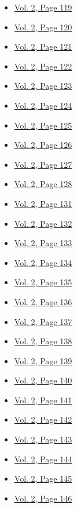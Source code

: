 \begin{itemize}
\begin{itemize}
  \item
    \protect\hyperlink{g-page-331}{Vol. 2, Page 119}
  \item
    \protect\hyperlink{g-page-332}{Vol. 2, Page 120}
  \item
    \protect\hyperlink{g-page-333}{Vol. 2, Page 121}
  \item
    \protect\hyperlink{g-page-334}{Vol. 2, Page 122}
  \item
    \protect\hyperlink{g-page-335}{Vol. 2, Page 123}
  \item
    \protect\hyperlink{g-page-336}{Vol. 2, Page 124}
  \item
    \protect\hyperlink{g-page-337}{Vol. 2, Page 125}
  \item
    \protect\hyperlink{g-page-338}{Vol. 2, Page 126}
  \item
    \protect\hyperlink{g-page-339}{Vol. 2, Page 127}
  \item
    \protect\hyperlink{g-page-340}{Vol. 2, Page 128}
  \item
    \protect\hyperlink{g-page-343}{Vol. 2, Page 131}
  \item
    \protect\hyperlink{g-page-344}{Vol. 2, Page 132}
  \item
    \protect\hyperlink{g-page-345}{Vol. 2, Page 133}
  \item
    \protect\hyperlink{g-page-346}{Vol. 2, Page 134}
  \item
    \protect\hyperlink{g-page-347}{Vol. 2, Page 135}
  \item
    \protect\hyperlink{g-page-348}{Vol. 2, Page 136}
  \item
    \protect\hyperlink{g-page-349}{Vol. 2, Page 137}
  \item
    \protect\hyperlink{g-page-350}{Vol. 2, Page 138}
  \item
    \protect\hyperlink{g-page-351}{Vol. 2, Page 139}
  \item
    \protect\hyperlink{g-page-352}{Vol. 2, Page 140}
  \item
    \protect\hyperlink{g-page-353}{Vol. 2, Page 141}
  \item
    \protect\hyperlink{g-page-354}{Vol. 2, Page 142}
  \item
    \protect\hyperlink{g-page-355}{Vol. 2, Page 143}
  \item
    \protect\hyperlink{g-page-356}{Vol. 2, Page 144}
  \item
    \protect\hyperlink{g-page-357}{Vol. 2, Page 145}
  \item
    \protect\hyperlink{g-page-358}{Vol. 2, Page 146}

\end{itemize}
\end{itemize}

